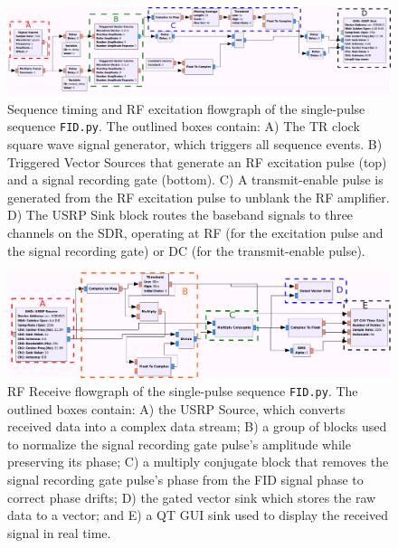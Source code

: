 \documentclass[review]{elsarticle}
\begin{document}
\begin{figure}[ht]
\begin{center}
\includegraphics[width = \textwidth,trim=0 0 0 0,clip=false]{fid_tx.png}
\caption{Sequence timing and RF excitation flowgraph of the single-pulse sequence \texttt{FID.py}.
The outlined boxes contain: A) The TR clock square wave signal generator, which triggers all sequence events. 
B) Triggered Vector Sources that generate an RF excitation pulse (top) and a signal recording gate (bottom). 
C) A transmit-enable pulse is generated from the RF excitation pulse to unblank the RF amplifier.
D) The USRP Sink block routes the baseband signals to three channels on the SDR, 
operating at RF (for the excitation pulse and the signal recording gate) or DC (for the transmit-enable pulse).}
\label{fig:txflow}
\end{center}
\end{figure}

\begin{figure}[ht]
\begin{center}
\includegraphics[width = \textwidth,trim=0 0 0 0,clip=false]{fid_rx.png}
\caption{RF Receive flowgraph of the single-pulse sequence \texttt{FID.py}.  
The outlined boxes contain: A) the USRP
Source, which converts received data into a complex data stream; 
B) a group of blocks used to
normalize the signal recording gate pulse's amplitude while preserving its phase; 
C) a multiply conjugate block that removes the signal recording gate pulse's phase from the FID signal phase to correct phase drifts; 
D) the gated vector sink which stores the raw data to a vector; and E) a QT GUI sink used to display the received signal in real time.}
\label{fig:rxflow}
\end{center}
\end{figure}
\end{document}
